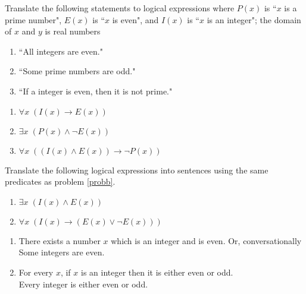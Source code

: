 \documentclass[12pt,addpoints]{exam}
\newcommand{\ra}{\rightarrow}
\begin{document}
\begin{questions}
\question[6]\label{probb} Translate the following statements to logical expressions where $P(x)$ is ``$x$ is a prime number", $E(x)$ is ``$x$ is even", and $I(x)$ is ``$x$ is an integer"; the domain of $x$ and $y$ is real numbers
\begin{enumerate}[label=(\alph*),itemsep=0pt,parsep=0pt,topsep=0pt,partopsep=0pt]
    \item ``All integers are even."
    \item ``Some prime numbers are odd."
    \item ``If a integer is even, then it is not prime."
\end{enumerate}
    \ifprintanswers
        \vspace{-10pt}
    \fi
\begin{solution}
    \begin{enumerate}[label=(\alph*),itemsep=0pt,parsep=0pt,topsep=0pt,partopsep=0pt]
        \item $\forall x\; (I(x) \ra E(x))$
        \item $\exists x\; (P(x) \wedge \neg E(x))$
        \item $\forall x\; ((I(x) \wedge E(x)) \ra \neg P(x))$
    \end{enumerate}
\end{solution}


\question[4] Translate the following logical expressions into sentences using the same predicates as problem \ref{probb}.
\begin{enumerate}[label=(\alph*),itemsep=0pt,parsep=0pt,topsep=0pt,partopsep=0pt]
    \item $\exists x\; (I(x) \wedge E(x))$
    \item $\forall x\; (I(x) \ra (E(x) \vee \neg E(x)))$
\end{enumerate}
    \ifprintanswers
        \vspace{-10pt}
    \fi
\begin{solution}
    \begin{enumerate}[label=(\alph*),itemsep=0pt,parsep=0pt,topsep=0pt,partopsep=0pt]
        \item There exists a number $x$ which is an integer and is even. Or, conversationally \\
            Some integers are even.
        \item For every $x$, if $x$ is an integer then it is either even or odd. \\
            Every integer is either even or odd.
    \end{enumerate}
\end{solution}


\end{questions}
\end{document}
